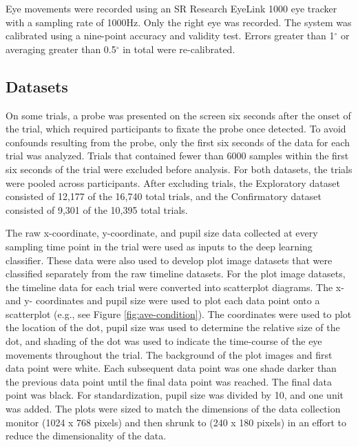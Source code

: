 \documentclass[
  english,
  man, donotrepeattitle,floatsintext]{apa6}
\begin{document}
Eye movements were recorded using an SR Research EyeLink 1000 eye tracker with a sampling rate of 1000Hz. Only the right eye was recorded. The system was calibrated using a nine-point accuracy and validity test. Errors greater than 1\(^{\circ}\) or averaging greater than 0.5\(^{\circ}\) in total were re-calibrated.

\subsection{Datasets}

On some trials, a probe was presented on the screen six seconds after the onset of the trial, which required participants to fixate the probe once detected. To avoid confounds resulting from the probe, only the first six seconds of the data for each trial was analyzed. Trials that contained fewer than 6000 samples within the first six seconds of the trial were excluded before analysis. For both datasets, the trials were pooled across participants. After excluding trials, the Exploratory dataset consisted of 12,177 of the 16,740 total trials, and the Confirmatory dataset consisted of 9,301 of the 10,395 total trials.

The raw x-coordinate, y-coordinate, and pupil size data collected at every sampling time point in the trial were used as inputs to the deep learning classifier. These data were also used to develop plot image datasets that were classified separately from the raw timeline datasets. For the plot image datasets, the timeline data for each trial were converted into scatterplot diagrams. The x- and y- coordinates and pupil size were used to plot each data point onto a scatterplot (e.g., see Figure \ref{fig:ave-condition}). The coordinates were used to plot the location of the dot, pupil size was used to determine the relative size of the dot, and shading of the dot was used to indicate the time-course of the eye movements throughout the trial. The background of the plot images and first data point were white. Each subsequent data point was one shade darker than the previous data point until the final data point was reached. The final data point was black. For standardization, pupil size was divided by 10, and one unit was added. The plots were sized to match the dimensions of the data collection monitor (1024 x 768 pixels) and then shrunk to (240 x 180 pixels) in an effort to reduce the dimensionality of the data.
\end{document}
